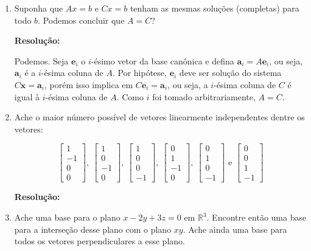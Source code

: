 \documentclass[leqno]{article}
\numberwithin{equation}{section}
\newcommand{\bR}{\mathbb{R}}
\newcommand{\bfe}{\mathbf{e}}
\newcommand{\bfa}{\mathbf{a}}
\newcommand{\bfx}{\mathbf{x}}
\newcommand{\bvecfour}[4]{%
    \begin{bmatrix} #1 \\ #2 \\ #3 \\ #4 \end{bmatrix}
}
\newenvironment{sol}
{
    \vspace{4mm}
    \noindent\textbf{Resolução:}
    \strut\newline
    \smallskip
    \hspace{-3.5mm}
}
{}
\begin{document}
\begin{enumerate}
        Use a eliminação de Gauss-Jordan para reduzir as matrizes $[U \ 0]$ e $[U \ c]$ para $[R \ 0]$ e $[R \ d]$. Resolva $Rx = 0$ e $Rx = d$

        \begin{sol} 
        \end{sol} 

    \item Suponha que $Ax = b$ e $Cx = b$ tenham as mesmas soluções (completas) para todo $b$. Podemos concluir que $A = C$?

        \begin{sol} 
            Podemos.
            Seja \( \bfe_{ i } \) o \( i \)-ésimo vetor da base canônica e defina \( \bfa_{ i } = A \bfe_{ i } \), ou seja, \( \bfa_{ i } \) é a \( i \)-ésima coluna de \( A \).
            Por hipótese, \( \bfe_{ i } \) deve ser solução do sistema \( C \bfx = \bfa_{ i } \), porém isso implica em \( C \bfe_{ i } = \bfa_{ i } \), ou seja, a \( i \)-ésima coluna de \( C \) é igual à \( i \)-ésima coluna de \( A \).
            Como \( i \) foi tomado arbitrariamente, \( A = C \).
        \end{sol} 

    \item Ache o maior número possível de vetores linearmente independentes dentre os vetores:

        $$\bvecfour{1}{-1}{0}{0}, \ \bvecfour{1}{0}{-1}{0}, \ \bvecfour{1}{0}{0}{-1}, \ \bvecfour{0}{1}{-1}{0}, \ \bvecfour{0}{1}{0}{-1} \mbox{ e } \bvecfour{0}{0}{1}{-1}$$

        \begin{sol} 
        \end{sol} 

    \item Ache uma base para o plano $x - 2y + 3z = 0$ em $\bR^3$. Encontre então uma base para a interseção desse plano com o plano $xy$. Ache ainda uma base para todos os vetores perpendiculares a esse plano.


\end{enumerate}
\end{document}
